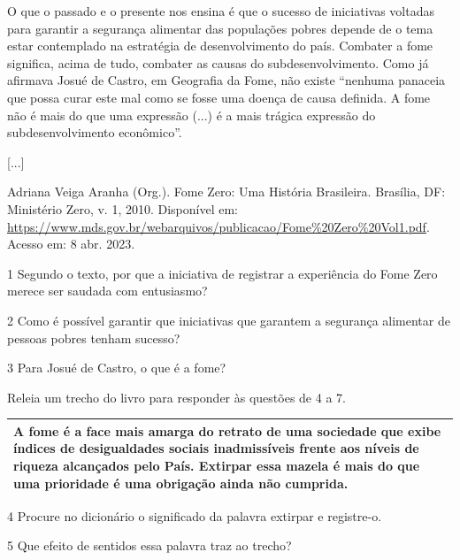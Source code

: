 \begin{itemize}
\begin{itemize}
{\begin{itemize}
\begin{itemize}
O que o passado e o presente nos ensina é que o sucesso de iniciativas
voltadas para garantir a segurança alimentar das populações pobres
depende de o tema estar contemplado na estratégia de desenvolvimento do
país. Combater a fome significa, acima de tudo, combater as causas do
subdesenvolvimento. Como já afirmava Josué de Castro, em Geografia da
Fome, não existe ``nenhuma panaceia que possa curar este mal como se
fosse uma doença de causa definida. A fome não é mais do que uma
expressão (...) é a mais trágica expressão do subdesenvolvimento
econômico''.

{[}...{]}

Adriana Veiga Aranha (Org.). Fome Zero: Uma História Brasileira.
Brasília, DF: Ministério Zero, v. 1, 2010. Disponível em:
\url{https://www.mds.gov.br/webarquivos/publicacao/Fome\%20Zero\%20Vol1.pdf}.
Acesso em: 8 abr. 2023.

\num{1} Segundo o texto, por que a iniciativa de registrar a experiência
do Fome Zero merece ser saudada com entusiasmo? 

\num{2} Como é possível garantir que iniciativas que garantem a
segurança alimentar de pessoas pobres tenham sucesso? 

\num{3} Para Josué de Castro, o que é a fome? 

Releia um trecho do livro para responder às questões de 4 a 7.

\begin{longtable}[]{@{}l@{}}
\toprule
A fome é a face mais amarga do retrato de uma sociedade que exibe
índices de desigualdades sociais inadmissíveis frente aos níveis de
riqueza alcançados pelo País. Extirpar essa mazela é mais do que uma
prioridade é uma obrigação ainda não cumprida.\tabularnewline
\bottomrule
\end{longtable}

\num{4} Procure no dicionário o significado da palavra extirpar e
registre-o.  

\num{5} Que efeito de sentidos essa palavra traz ao trecho? 


\end{itemize}
\end{itemize}}
\end{itemize}
\end{itemize}
